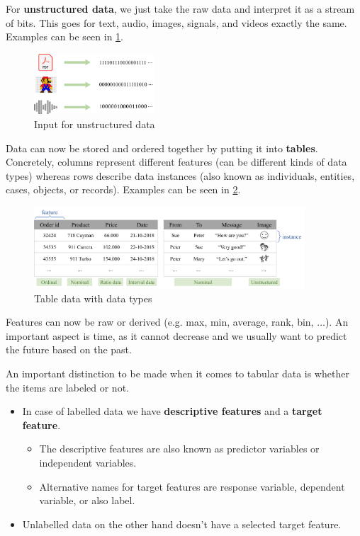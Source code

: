 For \textbf{unstructured data}, we just take the raw data and interpret it as a stream of bits. This goes for text, audio, images, signals, and videos exactly the same. Examples can be seen in \ref{fig:1_unstructured_data}.

\begin{figure}[H]
  \centering
  \includegraphics[width=0.4\textwidth]{assets/basics/unstructured_data.png}
  \caption{Input for unstructured data}
  \label{fig:1_unstructured_data}
\end{figure}

Data can now be stored and ordered together by putting it into \textbf{tables}. Concretely, columns represent different features (can be different kinds of data types) whereas rows describe data instances (also known as individuals, entities, cases, objects, or records). Examples can be seen in \ref{fig:1_table_data}.

\begin{figure}[H]
  \centering
  \includegraphics[width=0.9\textwidth]{assets/basics/table_data.png}
  \caption{Table data with data types}
  \label{fig:1_table_data}
\end{figure}

Features  can now be raw or derived (e.g. max, min, average, rank, bin, $\dots$). An important aspect is time, as it cannot decrease and we usually want to predict the future based on the past. 

An important distinction to be made when it comes to tabular data is whether the items are labeled or not.
\begin{itemize}
  \item {}In case of labelled data we have \textbf{descriptive features} and a \textbf{target feature}.
  \begin{itemize}
    \item The descriptive features are also known as predictor variables or independent variables.
    \item Alternative names for target features are response variable, dependent variable, or also label.
  \end{itemize}
  \item {}Unlabelled data on the other hand doesn't have a selected target feature.
\end{itemize}
